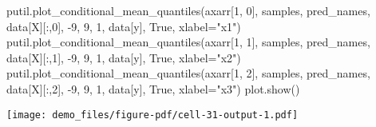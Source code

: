 \documentclass[
  letterpaper,
  DIV=11,
  numbers=noendperiod]{scrartcl}
\newenvironment{Shaded}{\begin{snugshade}}{\end{snugshade}}
\newcommand{\DecValTok}[1]{\textcolor[rgb]{0.68,0.00,0.00}{#1}}
\newcommand{\NormalTok}[1]{\textcolor[rgb]{0.00,0.23,0.31}{#1}}
\newcommand{\OperatorTok}[1]{\textcolor[rgb]{0.37,0.37,0.37}{#1}}
\newcommand{\StringTok}[1]{\textcolor[rgb]{0.13,0.47,0.30}{#1}}
\newcommand{\VariableTok}[1]{\textcolor[rgb]{0.07,0.07,0.07}{#1}}
\begin{document}
\begin{Shaded}
\begin{Highlighting}[]
\NormalTok{putil.plot\_conditional\_mean\_quantiles(axarr[}\DecValTok{1}\NormalTok{, }\DecValTok{0}\NormalTok{], samples, pred\_names,}
\NormalTok{                                      data[}\StringTok{\textquotesingle{}X\textquotesingle{}}\NormalTok{][:,}\DecValTok{0}\NormalTok{], }\OperatorTok{{-}}\DecValTok{9}\NormalTok{, }\DecValTok{9}\NormalTok{, }\DecValTok{1}\NormalTok{,}
\NormalTok{                                      data[}\StringTok{\textquotesingle{}y\textquotesingle{}}\NormalTok{], }\VariableTok{True}\NormalTok{, xlabel}\OperatorTok{=}\StringTok{"x1"}\NormalTok{)}
\NormalTok{putil.plot\_conditional\_mean\_quantiles(axarr[}\DecValTok{1}\NormalTok{, }\DecValTok{1}\NormalTok{], samples, pred\_names,}
\NormalTok{                                      data[}\StringTok{\textquotesingle{}X\textquotesingle{}}\NormalTok{][:,}\DecValTok{1}\NormalTok{], }\OperatorTok{{-}}\DecValTok{9}\NormalTok{, }\DecValTok{9}\NormalTok{, }\DecValTok{1}\NormalTok{,}
\NormalTok{                                      data[}\StringTok{\textquotesingle{}y\textquotesingle{}}\NormalTok{], }\VariableTok{True}\NormalTok{, xlabel}\OperatorTok{=}\StringTok{"x2"}\NormalTok{)}
\NormalTok{putil.plot\_conditional\_mean\_quantiles(axarr[}\DecValTok{1}\NormalTok{, }\DecValTok{2}\NormalTok{], samples, pred\_names,}
\NormalTok{                                      data[}\StringTok{\textquotesingle{}X\textquotesingle{}}\NormalTok{][:,}\DecValTok{2}\NormalTok{], }\OperatorTok{{-}}\DecValTok{9}\NormalTok{, }\DecValTok{9}\NormalTok{, }\DecValTok{1}\NormalTok{,}
\NormalTok{                                      data[}\StringTok{\textquotesingle{}y\textquotesingle{}}\NormalTok{], }\VariableTok{True}\NormalTok{, xlabel}\OperatorTok{=}\StringTok{"x3"}\NormalTok{)}
\NormalTok{plot.show()}
\end{Highlighting}
\end{Shaded}

\texttt{[image: demo\_files/figure-pdf/cell-31-output-1.pdf]}
\end{document}

